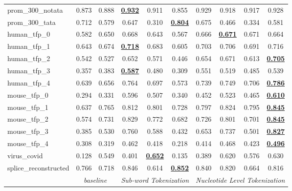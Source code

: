 \begin{table*}[h!]
\begin{center}
\begin{tabular}{l|cc|ccc|cccc}
prom\_300\_notata & 0.873 & 0.888 & {\ul \textbf{0.932}} & 0.911 & 0.855 & 0.929 & 0.918 & 0.917 & 0.928 \\
prom\_300\_tata & 0.712 & 0.579 & 0.647 & 0.310 & {\ul \textbf{0.804}} & 0.675 & 0.466 & 0.334 & 0.581 \\
human\_tfp\_0 & 0.582 & 0.650 & 0.668 & 0.643 & 0.567 & 0.666 & {\ul \textbf{0.671}} & 0.671 & 0.664 \\
human\_tfp\_1 & 0.643 & 0.674 & {\ul \textbf{0.718}} & 0.683 & 0.605 & 0.703 & 0.706 & 0.691 & 0.716 \\
human\_tfp\_2 & 0.542 & 0.527 & 0.652 & 0.571 & 0.446 & 0.654 & 0.671 & 0.613 & {\ul \textbf{0.705}} \\
human\_tfp\_3 & 0.357 & 0.383 & {\ul \textbf{0.587}} & 0.480 & 0.309 & 0.551 & 0.519 & 0.485 & 0.539 \\
human\_tfp\_4 & 0.639 & 0.656 & 0.764 & 0.697 & 0.573 & 0.739 & 0.749 & 0.706 & {\ul \textbf{0.786}} \\
mouse\_tfp\_0 & 0.294 & 0.331 & 0.596 & 0.507 & 0.340 & 0.452 & 0.523 & 0.465 & {\ul \textbf{0.610}} \\
mouse\_tfp\_1 & 0.637 & 0.765 & 0.812 & 0.801 & 0.728 & 0.797 & 0.824 & 0.795 & {\ul \textbf{0.845}} \\
mouse\_tfp\_2 & 0.574 & 0.731 & 0.829 & 0.772 & 0.682 & 0.726 & 0.801 & 0.701 & {\ul \textbf{0.845}} \\
mouse\_tfp\_3 & 0.385 & 0.530 & 0.760 & 0.588 & 0.432 & 0.653 & 0.737 & 0.501 & {\ul \textbf{0.827}} \\
mouse\_tfp\_4 & 0.308 & 0.319 & 0.462 & 0.418 & 0.218 & 0.414 & 0.468 & 0.423 & {\ul \textbf{0.496}} \\
virus\_covid & 0.128 & 0.549 & 0.401 & {\ul \textbf{0.652}} & 0.135 & 0.389 & 0.620 & 0.576 & 0.630 \\
splice\_reconstructed & 0.766 & 0.718 & 0.846 & 0.614 & {\ul \textbf{0.852}} & 0.840 & 0.820 & 0.664 & 0.816 \\
\hline
\multicolumn{1}{l|}{} & \multicolumn{2}{c|}{\textit{baseline}} & \multicolumn{3}{c|}{\textit{Sub-word Tokenization}} & \multicolumn{4}{c}{\textit{Nucleotide Level Tokenization}} \\ \hline
\end{tabular}
\end{center}
\end{table*}